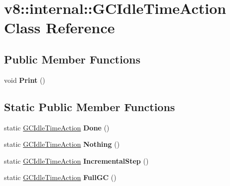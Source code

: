 \hypertarget{classv8_1_1internal_1_1_g_c_idle_time_action}{}\section{v8\+:\+:internal\+:\+:G\+C\+Idle\+Time\+Action Class Reference}
\label{classv8_1_1internal_1_1_g_c_idle_time_action}
\subsection*{Public Member Functions}
\begin{DoxyCompactItemize}
\item 
void {\bfseries Print} ()\hypertarget{classv8_1_1internal_1_1_g_c_idle_time_action_ac951633897220ff928cbc7116c6b706b}{}\label{classv8_1_1internal_1_1_g_c_idle_time_action_ac951633897220ff928cbc7116c6b706b}

\end{DoxyCompactItemize}
\subsection*{Static Public Member Functions}
\begin{DoxyCompactItemize}
\item 
static \hyperlink{classv8_1_1internal_1_1_g_c_idle_time_action}{G\+C\+Idle\+Time\+Action} {\bfseries Done} ()\hypertarget{classv8_1_1internal_1_1_g_c_idle_time_action_a3a3f464e601fdd36eff7930a93d8aebe}{}\label{classv8_1_1internal_1_1_g_c_idle_time_action_a3a3f464e601fdd36eff7930a93d8aebe}

\item 
static \hyperlink{classv8_1_1internal_1_1_g_c_idle_time_action}{G\+C\+Idle\+Time\+Action} {\bfseries Nothing} ()\hypertarget{classv8_1_1internal_1_1_g_c_idle_time_action_ab367e637dc13755126195e0fd9c9de5c}{}\label{classv8_1_1internal_1_1_g_c_idle_time_action_ab367e637dc13755126195e0fd9c9de5c}

\item 
static \hyperlink{classv8_1_1internal_1_1_g_c_idle_time_action}{G\+C\+Idle\+Time\+Action} {\bfseries Incremental\+Step} ()\hypertarget{classv8_1_1internal_1_1_g_c_idle_time_action_a9ad30f42a1bdbe55f5d69ae6568ebe70}{}\label{classv8_1_1internal_1_1_g_c_idle_time_action_a9ad30f42a1bdbe55f5d69ae6568ebe70}

\item 
static \hyperlink{classv8_1_1internal_1_1_g_c_idle_time_action}{G\+C\+Idle\+Time\+Action} {\bfseries Full\+GC} ()\hypertarget{classv8_1_1internal_1_1_g_c_idle_time_action_a83a3580041a8923c2e010c18a214e812}{}\label{classv8_1_1internal_1_1_g_c_idle_time_action_a83a3580041a8923c2e010c18a214e812}

\end{DoxyCompactItemize}
